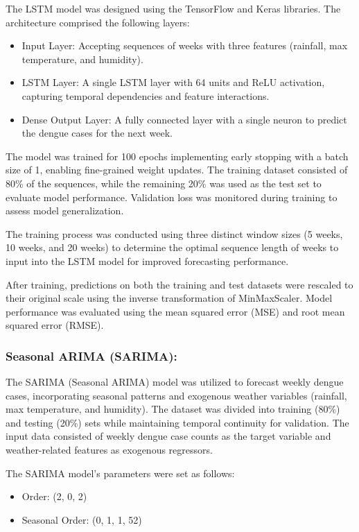 The LSTM model was designed using the TensorFlow and Keras libraries. The architecture comprised the following layers:
\begin{itemize}
	\item Input Layer: Accepting sequences of weeks with three features (rainfall, max temperature, and humidity).
	\item LSTM Layer: A single LSTM layer with 64 units and ReLU activation, capturing temporal dependencies and feature interactions.
	\item Dense Output Layer: A fully connected layer with a single neuron to predict the dengue cases for the next week.
\end{itemize}
The model was trained for 100 epochs implementing early stopping with a batch size of 1, enabling fine-grained weight updates. The training dataset consisted of 80\% of the sequences, while the remaining 20\% was used as the test set to evaluate model performance. Validation loss was monitored during training to assess model generalization.

The training process was conducted using three distinct window sizes (5 weeks, 10 weeks, and 20 weeks) to determine the optimal sequence length of weeks to input into the LSTM model for improved forecasting performance.

After training, predictions on both the training and test datasets were rescaled to their original scale using the inverse transformation of MinMaxScaler. Model performance was evaluated using the mean squared error (MSE) and root mean squared error (RMSE).

\subsubsection{Seasonal ARIMA (SARIMA):}
The SARIMA (Seasonal ARIMA) model was utilized to forecast weekly dengue cases, incorporating seasonal patterns and exogenous weather variables (rainfall, max temperature, and humidity). The dataset was divided into training (80\%) and testing (20\%) sets while maintaining temporal continuity for validation. The input data consisted of weekly dengue case counts as the target variable and weather-related features as exogenous regressors.

The SARIMA model's parameters were set as follows:
\begin{itemize}
	\item Order: (2, 0, 2)
	\item Seasonal Order: (0, 1, 1, 52)
\end{itemize}

